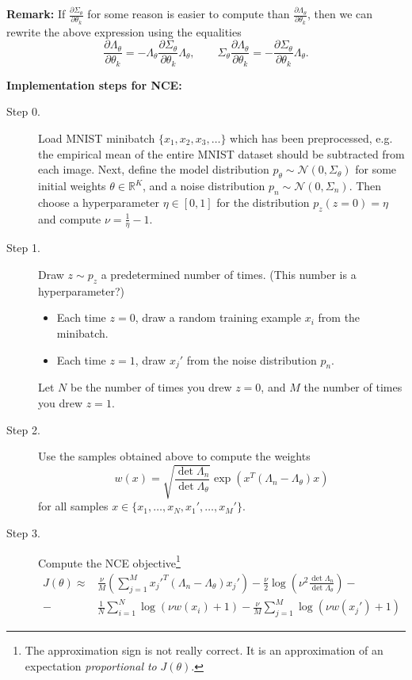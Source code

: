 \documentclass[a4paper]{article}
\begin{document}
\textbf{Remark:} If $\frac{\partial \Sigma_\theta}{\partial \theta_k}$ for some reason is easier to compute than $\frac{\partial \Lambda_\theta}{\partial \theta_k}$, then we can rewrite the above expression using the equalities
$$\frac{\partial \Lambda_\theta}{\partial \theta_k} = - \Lambda_\theta \frac{\partial \Sigma_\theta}{\partial \theta_k} \Lambda_\theta, \qquad \Sigma_\theta \frac{\partial \Lambda_\theta}{\partial \theta_k} = - \frac{\partial \Sigma_\theta}{\partial \theta_k} \Lambda_\theta.$$

\newpage
\textbf{\large Implementation steps for NCE:}

\begin{description}
\item[Step 0.] Load MNIST minibatch $\{x_1,x_2,x_3,\ldots\}$ which has been preprocessed, e.g. the empirical mean of the entire MNIST dataset should be subtracted from each image. Next, define the model distribution $p_\theta \sim \mathcal{N}(0,\Sigma_\theta)$ for some initial weights $\theta \in \mathbb{R}^K$, and a noise distribution $p_n \sim \mathcal{N}(0,\Sigma_n)$. Then choose a hyperparameter $\eta \in [0,1]$ for the distribution $p_z(z=0) = \eta$ and compute $\nu = \frac{1}{\eta} - 1$.

\item[Step 1.] Draw $z \sim p_z$ a predetermined number of times. (This number is a hyperparameter?)
\begin{itemize}
\item Each time $z = 0$, draw a random training example $x_i$ from the minibatch.
\item Each time $z = 1$, draw $x_j'$ from the noise distribution $p_n$.
\end{itemize}
Let $N$ be the number of times you drew $z = 0$, and $M$ the number of times you drew $z = 1$.

\item[Step 2.] Use the samples obtained above to compute the weights
$$w(x) =  \sqrt{\frac{\det \Lambda_n}{\det \Lambda_\theta}} \exp\left({x}^T (\Lambda_n - \Lambda_\theta) {x}\right)$$
for all samples $x \in \{ x_1,\ldots,x_N,x_1',\ldots,x_M'\}$.

\item[Step 3.] Compute the NCE objective\footnote{The approximation sign is not really correct. It is an approximation of an expectation \emph{proportional to} $J(\theta)$.}
$$\boxed{\begin{aligned}
J(\theta) \approx &\frac{\nu}{M} \left( \sum_{j=1}^M {x_j'}^T (\Lambda_n - \Lambda_\theta) {x_j'} \right)- \frac{\nu}{2} \log\left( \nu^2 \frac{\det \Lambda_n}{\det \Lambda_\theta}\right) -\\
- \ &\frac{1}{N} \sum_{i=1}^N \log\left( \nu w(x_i) + 1\right) - \frac{\nu}{M} \sum_{j=1}^M \log\left( \nu w(x_j')+ 1\right)
\end{aligned}}$$


\end{description}
\end{document}
